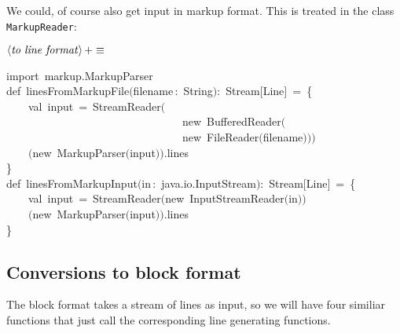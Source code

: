 \documentclass[a4paper,12pt]{article}
\begin{document}
We could, of course also get input in markup format. This is treated in
the class \texttt{MarkupReader}:

$\left<\mbox{\emph{to line format}}\right>+\equiv$
\begin{program}{\vem import}~markup.MarkupParser
\\{\vem def}~linesFromMarkupFile$($filename\,{\rm :}~String$)${\rm :}~Stream$[$Line$]$~=~{\small\{}
\\~~~~{\vem val}~input~=~StreamReader$($
\\~~~~~~~~~~~~~~~~~~~~~~~~~~~~~~~~{\vem new}~BufferedReader$($
\\~~~~~~~~~~~~~~~~~~~~~~~~~~~~~~~~{\vem new}~FileReader$($filename$)$$)$$)$
\\[0.5em]~~~~$(${\vem new}~MarkupParser$($input$)$$)$.lines
\\{\small\}}
\\[0.5em]{\vem def}~linesFromMarkupInput$($in\,{\rm :}~java.io.InputStream$)${\rm :}~Stream$[$Line$]$~=~{\small\{}
\\~~~~{\vem val}~input~=~StreamReader$(${\vem new}~InputStreamReader$($in$)$$)$
\\~~~~$(${\vem new}~MarkupParser$($input$)$$)$.lines
\\{\small\}}
\\[0.5em]
\end{program}



\subsection{Conversions to block format}
The block format takes a stream of lines as input, so we will have four similiar functions
that just call the corresponding line generating functions.
\end{document}
